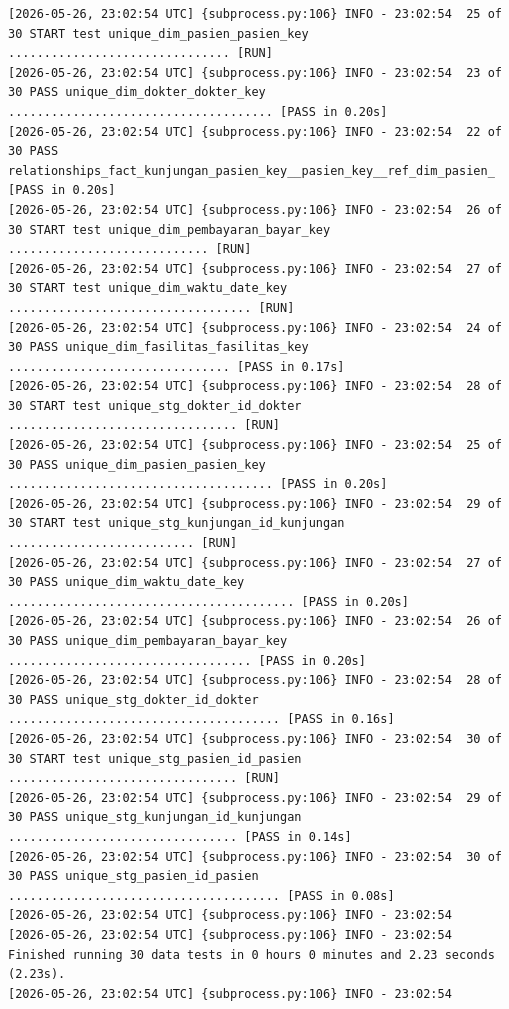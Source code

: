 \begin{lstlisting}[language={}, caption=Output Terminal dbt test pada Airflow Log]
[2026-05-26, 23:02:54 UTC] {subprocess.py:106} INFO - 23:02:54  25 of 30 START test unique_dim_pasien_pasien_key ............................... [RUN]
[2026-05-26, 23:02:54 UTC] {subprocess.py:106} INFO - 23:02:54  23 of 30 PASS unique_dim_dokter_dokter_key ..................................... [PASS in 0.20s]
[2026-05-26, 23:02:54 UTC] {subprocess.py:106} INFO - 23:02:54  22 of 30 PASS relationships_fact_kunjungan_pasien_key__pasien_key__ref_dim_pasien_  [PASS in 0.20s]
[2026-05-26, 23:02:54 UTC] {subprocess.py:106} INFO - 23:02:54  26 of 30 START test unique_dim_pembayaran_bayar_key ............................ [RUN]
[2026-05-26, 23:02:54 UTC] {subprocess.py:106} INFO - 23:02:54  27 of 30 START test unique_dim_waktu_date_key .................................. [RUN]
[2026-05-26, 23:02:54 UTC] {subprocess.py:106} INFO - 23:02:54  24 of 30 PASS unique_dim_fasilitas_fasilitas_key ............................... [PASS in 0.17s]
[2026-05-26, 23:02:54 UTC] {subprocess.py:106} INFO - 23:02:54  28 of 30 START test unique_stg_dokter_id_dokter ................................ [RUN]
[2026-05-26, 23:02:54 UTC] {subprocess.py:106} INFO - 23:02:54  25 of 30 PASS unique_dim_pasien_pasien_key ..................................... [PASS in 0.20s]
[2026-05-26, 23:02:54 UTC] {subprocess.py:106} INFO - 23:02:54  29 of 30 START test unique_stg_kunjungan_id_kunjungan .......................... [RUN]
[2026-05-26, 23:02:54 UTC] {subprocess.py:106} INFO - 23:02:54  27 of 30 PASS unique_dim_waktu_date_key ........................................ [PASS in 0.20s]
[2026-05-26, 23:02:54 UTC] {subprocess.py:106} INFO - 23:02:54  26 of 30 PASS unique_dim_pembayaran_bayar_key .................................. [PASS in 0.20s]
[2026-05-26, 23:02:54 UTC] {subprocess.py:106} INFO - 23:02:54  28 of 30 PASS unique_stg_dokter_id_dokter ...................................... [PASS in 0.16s]
[2026-05-26, 23:02:54 UTC] {subprocess.py:106} INFO - 23:02:54  30 of 30 START test unique_stg_pasien_id_pasien ................................ [RUN]
[2026-05-26, 23:02:54 UTC] {subprocess.py:106} INFO - 23:02:54  29 of 30 PASS unique_stg_kunjungan_id_kunjungan ................................ [PASS in 0.14s]
[2026-05-26, 23:02:54 UTC] {subprocess.py:106} INFO - 23:02:54  30 of 30 PASS unique_stg_pasien_id_pasien ...................................... [PASS in 0.08s]
[2026-05-26, 23:02:54 UTC] {subprocess.py:106} INFO - 23:02:54
[2026-05-26, 23:02:54 UTC] {subprocess.py:106} INFO - 23:02:54  Finished running 30 data tests in 0 hours 0 minutes and 2.23 seconds (2.23s).
[2026-05-26, 23:02:54 UTC] {subprocess.py:106} INFO - 23:02:54

\end{lstlisting}
